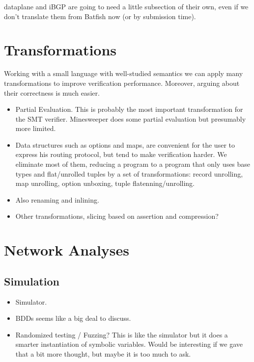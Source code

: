 \documentclass[sigconf,10pt]{acmart}
\begin{document}
dataplane and iBGP are going to need a little subsection of their own, even if we don't translate them from Batfish now (or by submission time).

%
%
%
%
\section{Transformations}
\label{sec:transformations}

Working with a small language with well-studied semantics we can apply many
transformations to improve verification performance. Moreover, arguing about their correctness is much easier.
\begin{itemize}
  \item Partial Evaluation. This is probably the most important transformation for the SMT verifier. Minesweeper does some partial evaluation but presumably more limited.
  \item Data structures such as options and maps, are convenient for the user to express his routing protocol, but tend to make verification harder. We eliminate most of them, reducing a program to a program that only uses base types and flat/unrolled tuples by a set of transformations: record unrolling, map unrolling, option unboxing, tuple flatenning/unrolling.
  \item Also renaming and inlining.
  \item Other transformations, slicing based on assertion and compression?
\end{itemize}



%
%
%
%

\section{Network Analyses}
\label{sec:analyses}


\subsection{Simulation}
\begin{itemize}
  \item Simulator.
  \item BDDs seems like a big deal to discuss.
  \item Randomized testing / Fuzzing? This is like the simulator but it does a smarter instantiation of symbolic variables. Would be interesting if we gave that a bit more thought, but maybe it is too much to ask.
\end{itemize}
\end{document}
